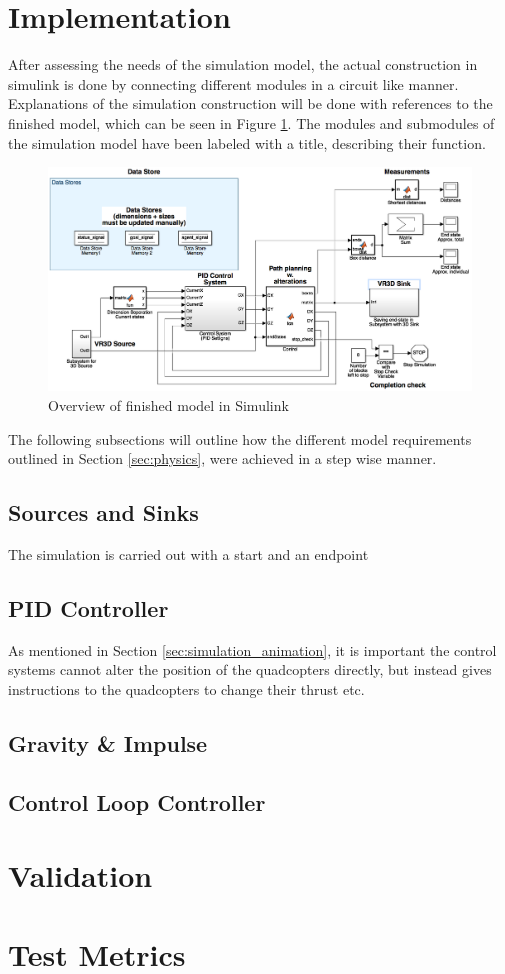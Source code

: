 \section{Implementation}
\label{sec:construction}

After assessing the needs of the simulation model, the actual construction in simulink is done by connecting different modules in a circuit like manner. Explanations of the simulation construction will be done with references to the finished model, which can be seen in Figure \ref{fig:model_overview}. The modules and submodules of the simulation model have been labeled with a title, describing their function. 

\begin{figure}[h!]
  \centering
  \includegraphics[width=1\columnwidth]{figures/model_overview}
  \caption{\label{fig:model_overview}Overview of finished model in Simulink}
\end{figure}

The following subsections will outline how the different model requirements outlined in Section \ref{sec:physics}, were achieved in a step wise manner.

\subsection{Sources and Sinks}
The simulation is carried out with a start and an endpoint 

\subsection{PID Controller}
As mentioned in Section \ref{sec:simulation_animation}, it is important the control systems cannot alter the position of the quadcopters directly, but instead gives instructions to the quadcopters to change their thrust etc. 

\subsection{Gravity \& Impulse}

\subsection{Control Loop Controller}

\section{Validation}
\label{sec:validation}

\section{Test Metrics}
\label{sec:test_metrics}


